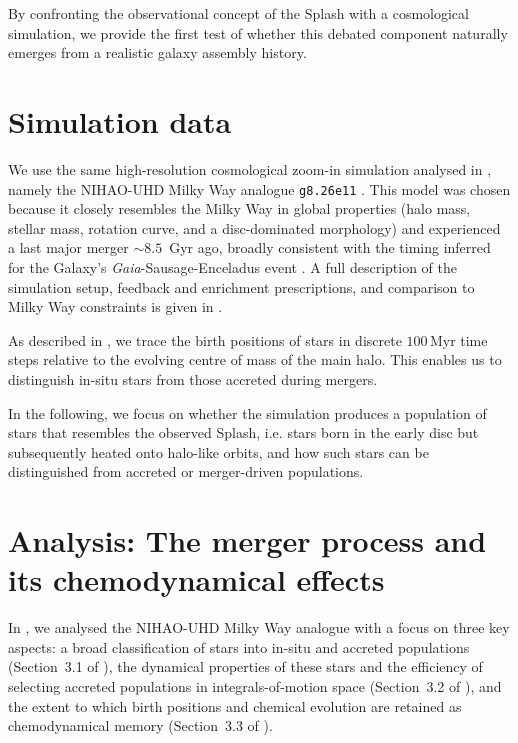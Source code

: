 \documentclass[fleqn,usenatbib]{mnras}
\begin{document}
By confronting the observational concept of the Splash with a cosmological simulation, we provide the first test of whether this debated component naturally emerges from a realistic galaxy assembly history.

\section{Simulation data}
\label{sec:data}

We use the same high-resolution cosmological zoom-in simulation analysed in , namely the NIHAO-UHD Milky Way analogue \texttt{g8.26e11} \citep{Wang2015, Buck2020b, Buck2021}. This model was chosen because it closely resembles the Milky Way in global properties (halo mass, stellar mass, rotation curve, and a disc-dominated morphology) and experienced a last major merger $\sim 8.5$~Gyr ago, broadly consistent with the timing inferred for the Galaxy’s \textit{Gaia}-Sausage-Enceladus event \citep{Helmi2018, Naidu2020}. A full description of the simulation setup, feedback and enrichment prescriptions, and comparison to Milky Way constraints is given in .

As described in , we trace the birth positions of stars in discrete $100\,\mathrm{Myr}$ time steps relative to the evolving centre of mass of the main halo. This enables us to distinguish in-situ stars from those accreted during mergers.  

In the following, we focus on whether the simulation produces a population of stars that resembles the observed Splash, i.e. stars born in the early disc but subsequently heated onto halo-like orbits, and how such stars can be distinguished from accreted or merger-driven populations.

\section{Analysis: The merger process and its chemodynamical effects} \label{sec:analysis}

In , we analysed the NIHAO-UHD Milky Way analogue with a focus on three key aspects: a broad classification of stars into in-situ and accreted populations (Section~3.1 of ), the dynamical properties of these stars and the efficiency of selecting accreted populations in integrals-of-motion space (Section~3.2 of ), and the extent to which birth positions and chemical evolution are retained as chemodynamical memory (Section~3.3 of ). 
\end{document}
